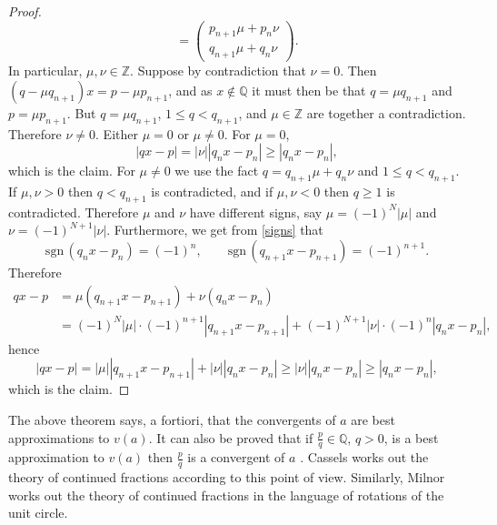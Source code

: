 \documentclass{article}
\def\sgn{\ensuremath{\mathrm{sgn}}\,}
\begin{document}
\begin{proof}
\[=\begin{pmatrix}p_{n+1} \mu + p_n \nu\\ q_{n+1}\mu+q_n \nu\end{pmatrix}.
\]
In particular, $\mu,\nu \in \mathbb{Z}$.
Suppose by contradiction that $\nu=0$. Then $(q-\mu q_{n+1})x = p-\mu p_{n+1}$, and as $x \not \in \mathbb{Q}$ it must then be that 
$q=\mu q_{n+1}$ and $p=\mu p_{n+1}$. But $q=\mu q_{n+1}$, $1 \leq q < q_{n+1}$, and $\mu \in \mathbb{Z}$ are together a contradiction. Therefore
$\nu \neq 0$. 
Either $\mu=0$ or $\mu \neq 0$. For $\mu =0$,
\[
|qx-p| = |\nu| |q_nx-p_n| \geq |q_nx-p_n|,
\]
which is the claim. For $\mu \neq 0$ we use the fact
$q = q_{n+1} \mu + q_n \nu$ and $1 \leq q < q_{n+1}$. If $\mu,\nu>0$ then $q<q_{n+1}$ is contradicted,
and if $\mu,\nu<0$ then $q \geq 1$ is contradicted. Therefore $\mu$ and $\nu$ have different signs, say $\mu=(-1)^N |\mu|$ and 
$\nu=(-1)^{N+1} |\nu|$.
Furthermore, we get from \eqref{signs} that
\[
\sgn (q_n x - p_n) = (-1)^n,
\qquad \sgn (q_{n+1} x - p_{n+1}) = (-1)^{n+1}.
\]
Therefore
\begin{align*}
qx-p&=\mu (q_{n+1} x - p_{n+1}) + \nu(q_n x - p_n)\\
&=(-1)^N |\mu| \cdot (-1)^{n+1} |q_{n+1}x-p_{n+1}|
+ (-1)^{N+1} |\nu| \cdot (-1)^n |q_nx-p_n|,
\end{align*}
hence
\[
|qx-p| =  |\mu| |q_{n+1}x-p_{n+1}| +  |\nu| |q_nx-p_n| \geq
  |\nu| |q_nx-p_n| \geq |q_nx-p_n|,
\]
which is the claim.
\end{proof}

The above theorem says, a fortiori, that the convergents of $a$ are best approximations to $v(a)$. It can also be proved
that if $\frac{p}{q} \in \mathbb{Q}$, $q>0$, is a best approximation to $v(a)$ then $\frac{p}{q}$ is a convergent of $a$ \cite[p.~9, Theorem 6]{MR0209227}.
Cassels \cite[p.~2, Chapter I]{cassels} works out the theory of continued 
fractions according to this point of view. Similarly, Milnor \cite[p.~234, Appendix C]{milnor} works out the theory of continued fractions in the language of rotations of the unit circle. 
\end{document}
